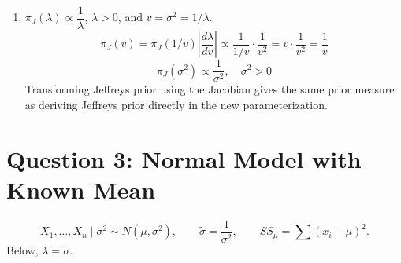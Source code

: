 \documentclass[11pt]{article}
\begin{document}
\begin{enumerate}
A prior that is flat in 1 parameterization generally becomes nonflat after a nonlinear transformation because of the Jacobian factor. So the parameterization used is what decides which prior we call a flat ``non-informative'' prior.

\item $\pi_J(\lambda) \propto \dfrac{1}{\lambda}$, $\lambda > 0$, and $v = \sigma^2 = 1/\lambda$.
\[
\pi_J(v) = \pi_J(1/v)\left|\frac{d\lambda}{dv}\right| \propto \frac{1}{1/v}\cdot\frac{1}{v^2} = v \cdot \frac{1}{v^2} = \frac{1}{v}
\]
\[
\boxed{\pi_J(\sigma^2) \propto \frac{1}{\sigma^2}, \quad \sigma^2 > 0}
\]
Transforming Jeffreys prior using the Jacobian gives the same prior measure as deriving Jeffreys prior directly in the new parameterization.
\end{enumerate}

\section*{Question 3: Normal Model with Known Mean}

\[
X_1,\dots,X_n \mid \sigma^2 \sim N(\mu, \sigma^2), \qquad \tilde\sigma = \frac{1}{\sigma^2}, \qquad SS_\mu = \sum (x_i - \mu)^2.
\]
Below, $\lambda = \tilde\sigma$.
\end{document}
